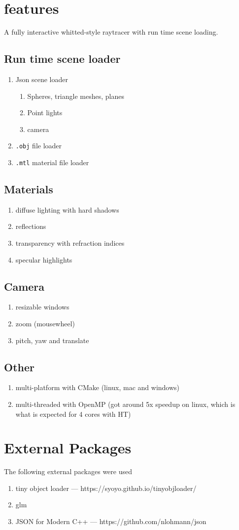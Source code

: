 \section{features}
A fully interactive whitted-style raytracer with run time scene loading.

\subsection{Run time scene loader}
    \begin{enumerate}
    \item Json scene loader
        \begin{enumerate}
        \item Spheres, triangle meshes, planes
        \item Point lights
        \item camera
        \end{enumerate}
    \item \verb|.obj| file loader
    \item \verb|.mtl| material file loader
    \end{enumerate}

\subsection{Materials}
    \begin{enumerate}
    \item diffuse lighting with hard shadows
    \item reflections
    \item transparency with refraction indices
    \item specular highlights
    \end{enumerate}

\subsection{Camera}
    \begin{enumerate}
    \item resizable windows
    \item zoom (mousewheel)
    \item pitch, yaw and translate
    \end{enumerate}

\subsection{Other}
    \begin{enumerate}
    \item multi-platform with CMake (linux, mac and windows)
    \item multi-threaded with OpenMP (got around 5x speedup on linux, which is what is expected for 4 cores with HT)
    \end{enumerate}

\section{External Packages}
The following external packages were used 
\begin{enumerate}
    \item tiny object loader --- https://syoyo.github.io/tinyobjloader/
    \item glm
    \item JSON for Modern C++ --- https://github.com/nlohmann/json
\end{enumerate}

